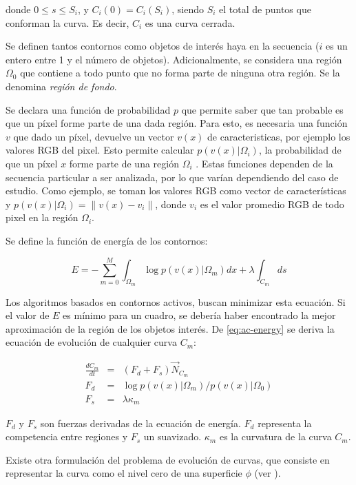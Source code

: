 \documentclass[a4paper,10pt]{article}
\begin{document}
donde $0 \leq s \leq S_i$, y $C_i(0) = C_i(S_i)$, siendo $S_i$ el total de puntos que conforman la curva.
Es decir, $C_i$ es una curva cerrada.

Se definen tantos contornos como objetos de interés haya en la secuencia ($i$ es un entero entre 1 y el número de objetos).
Adicionalmente, se considera una región $\Omega_0$ que contiene a todo punto que no forma parte de ninguna otra región.
Se la denomina \textit{región de fondo}.

Se declara una función de probabilidad $p$ que permite saber que tan probable es que un píxel forme parte de una dada región.
Para esto, es necesaria una función $v$ que dado un píxel, devuelve un vector $v(x)$ de caracteristicas, por ejemplo los valores RGB del pixel.
Esto permite calcular $p(v(x) \vert \Omega_i)$, la probabilidad de que un píxel $x$ forme parte de una región $\Omega_i$ .
Estas funciones dependen de la secuencia particular a ser analizada, por lo que varían dependiendo del caso de estudio.
Como ejemplo, se toman los valores RGB como vector de características y
$p(v(x) \vert \Omega_i) = \| v(x) - v_i \| $, donde $v_i$ es el valor promedio RGB de todo pixel en la región $\Omega_i$.

Se define la función de energía de los contornos:

\begin{equation}
    \label{eq:ac-energy}
    E = - \sum_{m=0}^{M}{\int_{\Omega_m}{\log{p(v(x) \vert \Omega_m)} dx} + \lambda \int_{C_m}{ds}}
\end{equation}

Los algoritmos basados en contornos activos, buscan minimizar esta ecuación. Si el valor de $E$ es mínimo para un cuadro, se
debería haber encontrado la mejor aproximación de la región de los objetos interés. De \ref{eq:ac-energy} se
deriva la ecuación de evolución de cualquier curva $C_m$:

\begin{eqnarray}
    \frac{dC_m}{dt} &=& (F_d + F_s) \overrightarrow{N}_{C_m} \\
    F_d &=& \log{p(v(x) \vert \Omega_m) / p(v(x) \vert \Omega_0)} \\
    F_s &=& \lambda \kappa_m \label{eq:ac-formal}
\end{eqnarray}

$F_d$ y $F_s$ son fuerzas derivadas de la ecuación de energía. $F_d$ representa la competencia entre regiones y $F_s$ un
suavizado. $\kappa_m$ es la curvatura de la curva $C_m$.

Existe otra formulación del problema de evolución de curvas, que consiste en
representar la curva como el nivel cero de una superficie $\phi$ (ver \cite{Osher88}).
\end{document}
